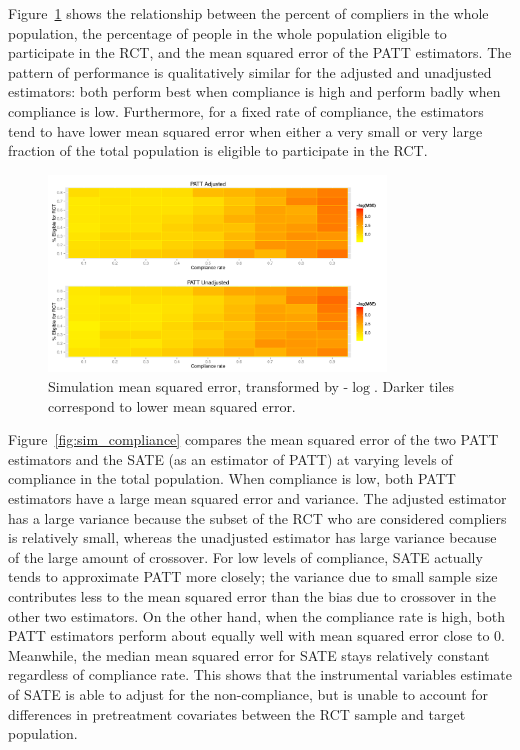 \documentclass[12pt]{article}
\begin{document}
Figure~\ref{fig:sim_tiles} shows the relationship between the percent of compliers in the whole population, the percentage of people in the whole population eligible to participate in the RCT, and the mean squared error of the PATT estimators.  The pattern of performance is qualitatively similar for the adjusted and unadjusted estimators: both perform best when compliance is high and perform badly when compliance is low.  Furthermore, for a fixed rate of compliance, the estimators tend to have lower mean squared error when either a very small or very large fraction of the total population is eligible to participate in the RCT. \\



\begin{figure}[htbp]
\begin{center}
\includegraphics[width = 0.8\textwidth]{mse_ratec_rates_B5}
\caption{Simulation mean squared error, transformed by -$\log$. Darker tiles correspond to lower mean squared error.}
\label{fig:sim_tiles}
\end{center}
\end{figure}

Figure~\ref{fig:sim_compliance} compares the mean squared error of the two PATT estimators and the SATE (as an estimator of PATT) at varying levels of compliance in the total population.  When compliance is low, both PATT estimators have a large mean squared error and variance.  The adjusted estimator has a large variance because the subset of the RCT who are considered compliers is relatively small, whereas the unadjusted estimator has large variance because of the large amount of crossover.  For low levels of compliance, SATE actually tends to approximate PATT more closely; the variance due to small sample size contributes less to the mean squared error than the bias due to crossover in the other two estimators.  On the other hand, when the compliance rate is high, both PATT estimators perform about equally well with mean squared error close to $0$.  Meanwhile, the median mean squared error for SATE stays relatively constant regardless of compliance rate.  This shows that the instrumental variables estimate of SATE is able to adjust for the non-compliance, but is unable to account for differences in pretreatment covariates between the RCT sample and target population.
\end{document}
